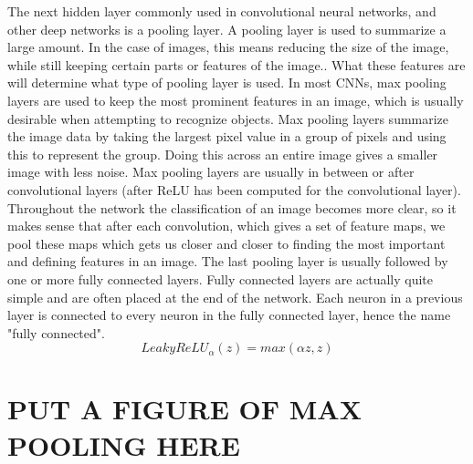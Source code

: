 \documentclass[12pt]{article} %
\begin{document}
	The next hidden layer commonly used in convolutional neural networks, and other deep networks is a pooling layer. A pooling layer is used to summarize a large amount. In the case of images, this means reducing the size of the image, while still keeping certain parts or features of the image.\cite{aurelienMachineLearning}. What these features are will determine what type of pooling layer is used. In most CNNs, max pooling layers are used to keep the most prominent features in an image, which is usually desirable when attempting to recognize objects. 
	Max pooling layers summarize the image data by taking the largest pixel value in a group of pixels and using this to represent the group. Doing this across an entire image gives a smaller image with less noise. Max pooling layers are usually in between or after convolutional layers (after ReLU has been computed for the convolutional layer). Throughout the network the classification of an image becomes more clear, so it makes sense that after each convolution, which gives a set of feature maps, we pool these maps which gets us closer and closer to finding the most important and defining features in an image. 
	The last pooling layer is usually followed by one or more fully connected layers. Fully connected layers are actually quite simple and are often placed at the end of the network. Each neuron in a previous layer is connected to every neuron in the fully connected layer, hence the name "fully connected"\cite{LeonardoFully}. 
 \begin{equation}
LeakyReLU_\alpha(z) = max(\alpha z, z)
  \end{equation}
  
  \section{PUT A  FIGURE OF MAX POOLING HERE }

	
\end{document}
